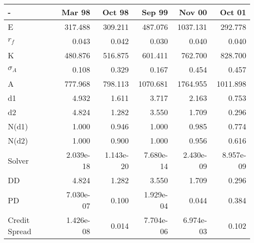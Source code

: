 \begin{tabular}{lrrrrr}
\toprule
             - &    Mar 98 &    Oct 98 &    Sep 99 &    Nov 00 &    Oct 01 \\
\midrule
             E &   317.488 &   309.211 &   487.076 &  1037.131 &   292.778 \\
         $r_f$ &     0.043 &     0.042 &     0.030 &     0.040 &     0.040 \\
             K &   480.876 &   516.875 &   601.411 &   762.700 &   828.700 \\
    $\sigma_A$ &     0.108 &     0.329 &     0.167 &     0.454 &     0.457 \\
             A &   777.968 &   798.113 &  1070.681 &  1764.955 &  1011.898 \\
            d1 &     4.932 &     1.611 &     3.717 &     2.163 &     0.753 \\
            d2 &     4.824 &     1.282 &     3.550 &     1.709 &     0.296 \\
         N(d1) &     1.000 &     0.946 &     1.000 &     0.985 &     0.774 \\
         N(d2) &     1.000 &     0.900 &     1.000 &     0.956 &     0.616 \\
        Solver & 2.039e-18 & 1.143e-20 & 7.680e-14 & 2.430e-09 & 8.957e-09 \\
            DD &     4.824 &     1.282 &     3.550 &     1.709 &     0.296 \\
            PD & 7.030e-07 &     0.100 & 1.929e-04 &     0.044 &     0.384 \\
 Credit Spread & 1.426e-08 &     0.014 & 7.704e-06 & 6.974e-03 &     0.102 \\
\bottomrule
\end{tabular}
